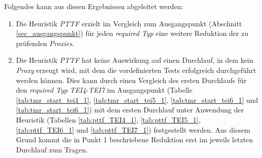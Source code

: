 \begin{multicols}{2}
\end{multicols}
\newpage
\noindent
Folgendes kann aus diesen Ergebnissen abgeleitet werden:
\begin{enumerate}
\item Die \Gls{Heuristik} \emph{PTTF} erzielt im Vergleich zum Ausgangspunkt (Abschnitt \ref{sec_ausgangspunkt}) für jeden \emph{required Typ} eine weitere Reduktion der zu prüfenden \emph{Proxies}.

\item Die Heuristik \emph{PTTF} hat keine Auswirkung auf einen Durchlauf, in dem kein \emph{Proxy} erzeugt wird, mit dem die vordefinierten Tests erfolgreich durchgeführt werden können. Dies kann durch einen Vergleich des ersten Durchlaufs für den \emph{required Typ} \emph{TEI4}-\emph{TEI7} im Ausgangspunkt (Tabelle \ref{tab:tmr_start_tei4_1}, \ref{tab:tmr_start_tei5_1}, \ref{tab:tmr_start_tei6_1} und \ref{tab:tmr_start_tei6_1}) mit dem ersten Durchlauf unter Anwendung der Heuristik (Tabellen \ref{tab:pttf_TEI4_1}, \ref{tab:pttf_TEI5_1}, \ref{tab:pttf_TEI6_1} und \ref{tab:pttf_TEI7_1}) festgestellt werden. Aus diesem Grund kommt die in Punkt 1 beschriebene Reduktion erst im jeweils letzten Durchlauf zum Tragen.
\end{enumerate}